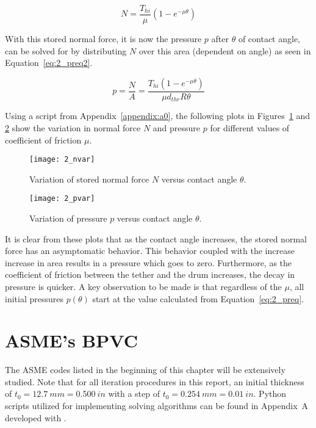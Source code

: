 \begin{equation}
	\label{eq:CapstanNorm2}
	N = \frac{T_{hi}}{\mu} \left( 1 - e^{-\mu \theta} \right)
\end{equation}

With this stored normal force, it is now the pressure $p$ after $\theta$ of contact angle,  can be solved for by distributing $N$ over this area (dependent on angle) as seen in Equation~\ref{eq:2_preq2}.

\begin{equation}
	\label{eq:2_preq2}
	p=\frac{N}{A}= \frac{T_{hi} \left( 1 - e^{-\mu \theta} \right)}{\mu d_{thr} R \theta}
\end{equation}

Using a script from Appendix~\ref{appendix:a0}, the following plots in Figures~\ref{fig:2_nvar} and \ref{fig:2_pvar} show the variation in normal force $N$ and pressure $p$ for different values of coefficient of friction $\mu$.

\begin{figure}[H]
	\centering
	\texttt{[image: 2\_nvar]}
	\caption{Variation of stored normal force $N$ versus contact angle $\theta$.}
	\label{fig:2_nvar}
\end{figure}

\begin{figure}[H]
	\centering
	\texttt{[image: 2\_pvar]}
	\caption{Variation of pressure $p$ versus contact angle $\theta$.}
	\label{fig:2_pvar}
\end{figure}

It is clear from these plots that as the contact angle increases, the stored normal force has an asymptomatic behavior. This behavior coupled with the increase increase in area results in a pressure which goes to zero. Furthermore, as the coefficient of friction between the tether and the drum increases, the decay in pressure is quicker. A key observation to be made is that regardless of the $\mu$, all initial pressures $p(\theta)$ start at the value calculated from Equation~\ref{eq:2_preq}.  

\section{ASME's BPVC}

The ASME codes listed in the beginning of this chapter will be extensively studied. Note that for all iteration procedures in this report, an initial thickness of $t_0 = 12.7\ mm=0.500\ in$ with a step of $t_0 = 0.254\ mm=0.01\ in$. Python scripts utilized for implementing solving algorithms can be found in Appendix~A developed with \cite{PYTHON}. 
